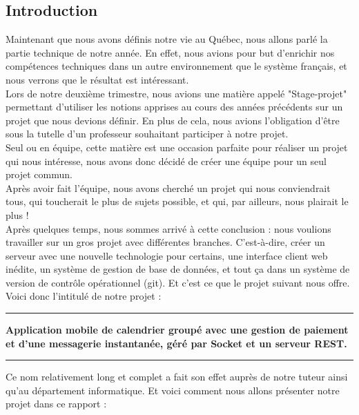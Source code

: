 \subsection{Introduction}

Maintenant que nous avons définis notre vie au Québec, nous allons parlé la partie technique de notre année. En effet, nous avions pour but d'enrichir nos compétences techniques dans un autre environnement que le système français, et nous verrons que le résultat est intéressant.
\\
Lors de notre deuxième trimestre, nous avions une matière appelé "Stage-projet" permettant d'utiliser les notions apprises au cours des années précédents sur un projet que nous devions définir. En plus de cela, nous avions l'obligation d'être sous la tutelle d'un professeur souhaitant participer à notre projet.\\

Seul ou en équipe, cette matière est une occasion parfaite pour réaliser un projet qui nous intéresse, nous avons donc décidé de créer une équipe pour un seul projet commun.\\

Après avoir fait l'équipe, nous avons cherché un projet qui nous conviendrait tous, qui toucherait le plus de sujets possible, et qui, par ailleurs, nous plairait le plus !\\

Après quelques temps, nous sommes arrivé à cette conclusion : nous voulions travailler sur un gros projet avec différentes branches. C'est-à-dire, créer un serveur avec une nouvelle technologie pour certains, une interface client web inédite, un système de gestion de base de données, et tout ça dans un système de version de contrôle opérationnel (git). Et c'est ce que le projet suivant nous offre. \\

Voici donc l'intitulé de notre projet : \\

\noindent
{\rule{\linewidth}{0.5mm} }
\begin{center}
\color{red}
    \textbf{Application mobile de calendrier groupé avec une gestion de paiement et d'une messagerie instantanée, géré par Socket et un serveur REST.}
\end{center}
\noindent
{\rule{\linewidth}{0.5mm} }

Ce nom relativement long et complet a fait son effet auprès de notre tuteur ainsi qu'au département informatique. Et voici comment nous allons présenter notre projet dans ce rapport : 

